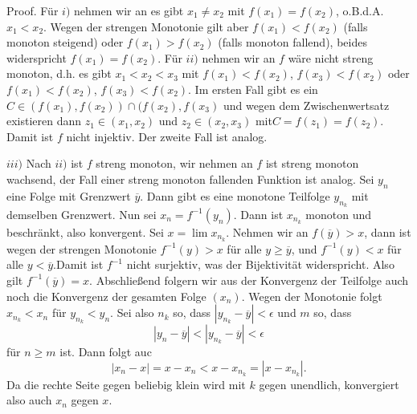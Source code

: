 \documentclass[letterpaper,10pt,english]{jupyterBook}
\begin{document}
\begin{emphBox}{}{}
Proof.  Für \(i)\) nehmen wir an es gibt \(x_1 \neq x_2\) mit \(f(x_1) = f(x_2)\), o.B.d.A. \(x_1 < x_2\). Wegen der strengen Monotonie gilt aber \(f(x_1) < f(x_2)\) (falls monoton steigend) oder \(f(x_1) > f(x_2)\) (falls monoton fallend), beides widerspricht \(f(x_1) = f(x_2)\).
Für \(ii)\) nehmen wir an \(f\) wäre nicht streng monoton, d.h. es gibt \(x_1 < x_2 < x_3\) mit \(f(x_1) < f(x_2)\), \(f(x_3) < f(x_2)\) oder \(f(x_1) < f(x_2)\), \(f(x_3) < f(x_2)\). Im ersten Fall gibt es ein \(C \in (f(x_1),f(x_2)) \cap (f(x_2),f(x_3)\) und wegen dem Zwischenwertsatz existieren dann \(z_1 \in (x_1,x_2)\) und \(z_2 \in (x_2,x_3)\) mit\(C = f(z_1) = f(z_2)\). Damit ist \(f\) nicht injektiv. Der zweite Fall ist analog.

\(iii)\) Nach \(ii)\) ist \(f\) streng monoton, wir nehmen an \(f\) ist streng monoton wachsend, der Fall einer streng monoton fallenden Funktion ist analog. Sei \(y_n\) eine Folge mit Grenzwert \(\overline{y}\). Dann gibt es eine monotone Teilfolge \(y_{n_k}\) mit demselben Grenzwert. Nun sei \(x_n = f^{-1}(y_n)\). Dann ist \(x_{n_k}\) monoton und beschränkt, also konvergent. Sei \(x= \lim x_{n_k}\). Nehmen wir an \(f(\overline{y}) > x\), dann ist wegen der strengen Monotonie \(f^{-1}(y) > x\) für alle \(y \geq \overline{y}\), und \(f^{-1}(y) < x\) für alle \(y < \overline{y}\).Damit ist \(f^{-1}\) nicht surjektiv, was der Bijektivität widerspricht. Also gilt \(f^{-1}(\overline{y}) = x\). Abschließend folgern wir aus der Konvergenz der Teilfolge auch noch die Konvergenz der gesamten Folge \((x_n)\). Wegen der Monotonie folgt \(x_{n_k} < x_n\) für \(y_{n_k} < y_n\). Sei also \(n_k\) so, dass  \(|y_{n_k} - \overline{y}| < \epsilon\) und \(m\) so, dass
\begin{equation*}
 |y_{n} - \overline{y}| < |y_{n_k} - \overline{y}| < \epsilon
\end{equation*}
für \(n \geq m\) ist. Dann folgt auc
\begin{equation*}
 |x_n - x|  = x - x_n < x-x_{n_k} = |x-x_{n_k}|.
\end{equation*}
Da die rechte Seite gegen beliebig klein wird mit \(k\) gegen unendlich, konvergiert also auch \(x_n\) gegen \(x\).
\end{emphBox}
\end{document}
